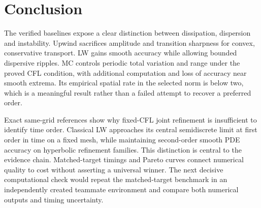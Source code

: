 \section{Conclusion}
The verified baselines expose a clear distinction between dissipation, dispersion and instability. Upwind sacrifices amplitude and transition sharpness for convex, conservative transport. LW gains smooth accuracy while allowing bounded dispersive ripples. MC controls periodic total variation and range under the proved CFL condition, with additional computation and loss of accuracy near smooth extrema. Its empirical spatial rate in the selected norm is below two, which is a meaningful result rather than a failed attempt to recover a preferred order.

Exact same-grid references show why fixed-CFL joint refinement is insufficient to identify time order. Classical LW approaches its central semidiscrete limit at first order in time on a fixed mesh, while maintaining second-order smooth PDE accuracy on hyperbolic refinement families. This distinction is central to the evidence chain. Matched-target timings and Pareto curves connect numerical quality to cost without asserting a universal winner. The next decisive computational check would repeat the matched-target benchmark in an independently created teammate environment and compare both numerical outputs and timing uncertainty.
